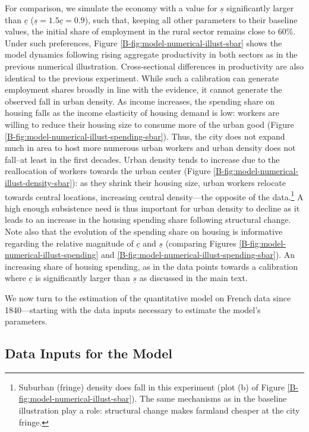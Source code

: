 \documentclass[11pt]{report}
\begin{document}
For comparison, we simulate the economy with a value for $\underline{s}$ significantly larger than $\underline{c}$ ($\underline{s}=1.5\underline{c}=0.9$), such that, keeping all other parameters to their baseline values, the initial share of employment in the rural sector remains close to 60\%. Under such preferences, Figure \ref{B-fig:model-numerical-illust-sbar} shows the model dynamics following rising aggregate productivity in both sectors as in the previous numerical illustration. Cross-sectional differences in productivity are also identical to the previous experiment. While such a calibration can generate employment shares broadly in line with the evidence, it cannot generate the observed fall in urban density. As income increases, the spending share on housing falls as the income elasticity of housing demand is low: workers are willing to reduce their housing size to consume more of the urban good (Figure \ref{B-fig:model-numerical-illust-spending-sbar}). Thus, the city does not expand much in area to host more numerous urban workers and urban density does not fall--at least in the first decades. Urban density tends to increase due to the reallocation of workers towards the urban center (Figure \ref{B-fig:model-numerical-illust-density-sbar}): as they shrink their housing size, urban workers relocate towards central locations, increasing central density---the opposite of the data.\footnote{Suburban (fringe) density does fall in this experiment (plot (b) of Figure \ref{B-fig:model-numerical-illust-sbar}). The same mechanisms as in the baseline illustration play a role: structural change makes farmland cheaper at the city fringe.}  A high enough subsistence need is thus important for urban density to decline as it leads to an increase in the housing spending share following structural change. Note also that the evolution of the spending share on housing is informative regarding the relative magnitude of $\underline{c}$ and $\underline{s}$  (comparing Figures \ref{B-fig:model-numerical-illust-spending} and \ref{B-fig:model-numerical-illust-spending-sbar}). An increasing share of housing spending, as in the data points towards a calibration where $\underline{c}$ is significantly larger than $\underline{s}$ as discussed in the main text.


We now turn to the estimation of the quantitative model on French data since 1840---starting with the data inputs necessary to estimate the model's parameters.

\subsection{Data Inputs for the Model}\label{B-sec:model-inputs}
\end{document}
